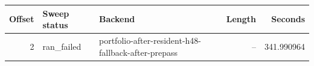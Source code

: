 {\small
\begin{tabular}{rllrr}
\hline
Offset & Sweep status & Backend & Length & Seconds \\
\hline
2 & ran_failed & portfolio-after-resident-h48-fallback-after-prepass & -- & 341.990964 \\
\hline
\end{tabular}
}
